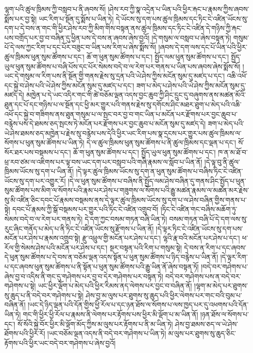 ལྷག་པའི་ཚུལ་ཁྲིམས་ཀྱི་བསླབ་པ་ནི་ཞབས་སོ། །ཤེས་རབ་ཀྱི་སྣ་འདྲེན་པ་ཡིན་པའི་ཕྱིར་རྐང་པ་རྣམས་ཀྱིས་ཞབས་སྨོས་པར་བྱ་སྟེ། ཡང་རིག་པ་སྔོན་དུ་སྨོས་པ་ཡིན་ཏེ། དེ་ཡོངས་སུ་དག་པས་ཚུལ་ཁྲིམས་དང་ཏིང་ངེ་འཛིན་ཡོངས་སུ་དག་པ་དེ་བས་ན་གང་གི་ཕྱིར་ཤེས་རབ་ཀྱི་མིག་གིས་བསྟན་ནས་ཚུལ་ཁྲིམས་དང་ཏིང་ངེ་འཛིན་དེ་གཉིས་ཀྱི་རྐང་པས་བགྲོད་པར་བྱ་བ་བཞིན་དུ་ཕྱིན་པས་དེ་བས་ན་ཞབས་ཞེས་བྱའོ། །དེ་གསུམ་ལ་བསླབ་པ་ཞེས་བསྟན་ཏེ། གསུམ་པོ་དེ་ལས་ཀྱང་རིག་པ་དང་པོར་བཟུང་བ་ཡིན་པས་རིག་པ་ཞེས་སྨོས་སོ། །ཞབས་དེ་དག་ལས་དང་པོ་ཡིན་པའི་ཕྱིར་ཚུལ་ཁྲིམས་ཕུན་སུམ་ཚོགས་པ་དང་། ཆོ་ག་ཕུན་སུམ་ཚོགས་པ་དང་། སྤྱོད་ལམ་ཕུན་སུམ་ཚོགས་པ་དང་། སྤྱོད་ཡུལ་ཕུན་སུམ་ཚོགས་པ་བཞི་པོས་དང་པོར་སེམས་བདེ་བ་ལ་རེག་པར་གནས་པ་ཡིན་པས་ཞབས་ཞེས་སྨོས་སོ། །ཡང་དེ་གསུམ་ལ་རིག་པས་ནི་སྔོན་གྱི་གནས་རྗེས་སུ་དྲན་པའི་ཡེ་ཤེས་ཀྱིས་མངོན་སུམ་དུ་མཛད་པ་དང་། འཆི་འཕོ་དང་སྐྱེ་བ་ཤེས་པའི་ཡེ་ཤེས་ཀྱིས་མངོན་སུམ་དུ་མཛད་པ་དང་། ཟག་པ་མེད་པ་ཤེས་པའི་ཡེ་ཤེས་ཀྱིས་མངོན་སུམ་དུ་མཛད་དེ། མཁྱེན་པ་དེ་ཡང་འདིར་གང་གི་ཚེ་བཅོམ་ལྡན་འདས་བྱང་ཆུབ་ཀྱི་ཤིང་དྲུང་དུ་བཞུགས་ནས་མཚན་མོའི་ཐུན་དང་པོ་དང་གཉིས་པ་ལ་སྔོན་དང་ཕྱི་མར་གྱུར་པའི་གནས་རྗེས་སུ་དགོངས་ཤིང་མཐར་ཐུག་པ་མེད་པའི་འཆི་འཕོ་དང་སྐྱེ་བ་གཟིགས་ནས་ཐུན་གསུམ་པ་ལ་སྤང་བར་བྱ་བ་གང་ཡིན་པ་མངོན་པར་རྫོགས་པར་བྱང་ཆུབ་པ་བརྙེས་པས་དེ་ཐམས་ཅད་སྤངས་ཏེ་མངོན་པར་རྫོགས་པར་བྱང་ཆུབ་པ་མངོན་སུམ་དུ་མཛད་དེ། ཟག་པ་མེད་པའི་ཡེ་ཤེས་ཐམས་ཅད་མཁྱེན་པ་རྗེས་སུ་བརྙེས་པས་དེའི་ཕྱིར་ཡང་རིག་པས་སྣ་དྲངས་པར་གྱུར་པས་ཚུལ་ཁྲིམས་ལ་སོགས་པ་ཕུན་སུམ་ཚོགས་པ་ཡིན་ཏེ། དེ་ལ་ཚུལ་ཁྲིམས་ཕུན་སུམ་ཚོགས་པ་ནི་ཚུལ་ཁྲིམས་དང་ལྡན་པ་དང་། སོ་སོར་ཐར་པས་བསྡམས་པ་དང་། ཆོ་ག་ཕུན་སུམ་ཚོགས་པ་དང་། སྤྱོད་ཡུལ་ཕུན་སུམ་ཚོགས་པ་དང་། ཁ་ན་མ་ཐོ་བ་ཕྲ་རབ་ཙམ་ལ་འཇིགས་པར་ལྟ་བས་ཡང་དག་པར་བསླབ་པའི་གཞི་རྣམས་ལ་སློབ་པ་ཡིན་ནོ། །དེ་ལྟ་བུ་ནི་ཚུལ་ཁྲིམས་ཡོངས་སུ་དག་པ་ཡིན་ནོ། །དེ་ལྟར་ཚུལ་ཁྲིམས་ཡོངས་སུ་དག་ན་ཕུན་སུམ་ཚོགས་པ་བཞིས་ཏིང་ངེ་འཛིན་ཡོངས་སུ་དག་པར་འགྱུར་རོ། །དེ་ལ་ཕུན་སུམ་ཚོགས་པ་བཞིས་ནི་སྤྱོད་ལམ་ཤེས་བཞིན་དུ་གནས་ཤིང་སྤྱོད་པ་ཕུན་སུམ་ཚོགས་པས་མིག་ལ་སོགས་པའི་རྣམ་པར་ཤེས་པ་གཟུགས་ལ་སོགས་པའི་རྒྱུ་མཚན་རྣམས་ལ་མཚན་མར་རྗེས་སུ་མི་འཛིན་ཅིང་དབང་པོ་རྣམས་བསྡམས་ནས་དེ་ལྟར་ཚུལ་ཁྲིམས་ཡོངས་སུ་དག་པ་ལ་ཤེས་བཞིན་གྱིས་གནས་པ་སྟེ། དབང་པོ་རྣམས་ཀྱི་སྒོ་བསྡམས་པར་གྱུར་པའི་ཏིང་ངེ་འཛིན་འགྲུབ་བོ། །ཏིང་ངེ་འཛིན་གང་བཞིས་མཆོག་ཏུ་སེམས་བདེ་བ་ལ་རེག་པར་གནས་ཏེ། དེ་དག་ཀྱང་བསམ་གཏན་བཞི་ཡིན་ཏེ། བསམ་གཏན་བཞི་པོ་དེ་དག་ལས་སུ་རུང་ཞིང་གནོད་པ་མེད་པ་ནི་ཏིང་ངེ་འཛིན་ཡོངས་སུ་རྫོགས་པ་ཡིན་ནོ། །དེ་ལྟར་ཏིང་ངེ་འཛིན་ཡོངས་སུ་དག་པས་མངོན་པར་ཤེས་པ་རྣམས་འགྲུབ་སྟེ། རྫུ་འཕྲུལ་གྱི་མངོན་པར་ཤེས་པ་དང་། ལྷའི་རྣ་བའི་མངོན་པར་ཤེས་པ་དང་། ཕ་རོལ་གྱི་སེམས་ཤེས་པའི་མངོན་པར་ཤེས་པ་དང་། སྔར་བསྟན་པའི་རིག་པ་གསུམ་སྟེ། དེ་བས་ན་རིག་པ་དང་ཞབས་དེ་ཕུན་སུམ་ཚོགས་པ་དེ་བས་ན་བཅོམ་ལྡན་འདས་སྟོན་པ་ཕུན་སུམ་ཚོགས་པ་ཉིད་བརྙེས་པ་ཡིན་ནོ། །དེ་ལྟར་རིག་པ་དང་ཞབས་ཕུན་སུམ་ཚོགས་པ་ནི་སྟོན་པ་ཕུན་སུམ་ཚོགས་པའི་རྒྱུ་ཡིན་ནོ་ཞེས་བསྟན་ཏོ། །བདེ་བར་གཤེགས་པ་ཞེས་བྱ་བ་འདིས་ནི་གང་དུ་གཤེགས་པར་བྱ་བ་དེར་གཤེགས་པར་བསྟན་ཏེ། བདེ་བར་གཤེགས་པས་ན་བདེ་བར་གཤེགས་པ་སྟེ། ཡང་ཕྱིར་ལྡོག་པ་མེད་པའི་ཕྱིར་རིམས་ནད་ལེགས་པར་བྱང་བ་བཞིན་ནོ། །ལྷག་མ་མེད་པར་ཐུགས་སུ་ཆུད་པ་ནི་བདེ་བར་གཤེགས་པ་སྟེ། ཤེས་བྱ་མ་ལུས་པར་ཐུགས་སུ་ཆུད་པའི་ཕྱིར་ལེགས་པར་གང་བའི་བུམ་པ་བཞིན་ནོ། །ཡང་དེ་ཉིད་ལྡན་པའི་དོན་གྱིས་ཕྱི་རོལ་པ་དང་ཉན་ཐོས་ལ་སོགས་པ་ལས་ཁྱད་པར་དུ་འཕགས་པའི་དོན་ཡིན་ཏེ། གང་གི་ཕྱིར་ཕྱི་རོལ་པ་རྣམས་ནི་ལེགས་པར་རྟོགས་པས་ཕྱིར་མི་ལྡོག་པ་མ་ཡིན་ནོ། །ཉན་ཐོས་ལ་སོགས་པ་དང་། སོ་སོའི་སྐྱེ་བོར་ཕྱིར་མི་ལྡོག་མོད་ཀྱིས་མ་ལུས་པར་རྟོགས་པ་ནི་མ་ཡིན་ཏེ། ཤེས་བྱ་ཐམས་ཅད་ལ་ཡེ་ཤེས་ཐོགས་པའི་ཕྱིར་རོ། །ཡང་བཅོམ་ལྡན་འདས་ནི་བདེ་བར་གཤེགས་པ་ཡིན་ཏེ། མ་ལུས་པར་ཐུགས་སུ་ཆུད་ཅིང་རྟོགས་པའི་ཕྱིར་ཡང་བདེ་བར་གཤེགས་པ་ཞེས་བྱའོ། 